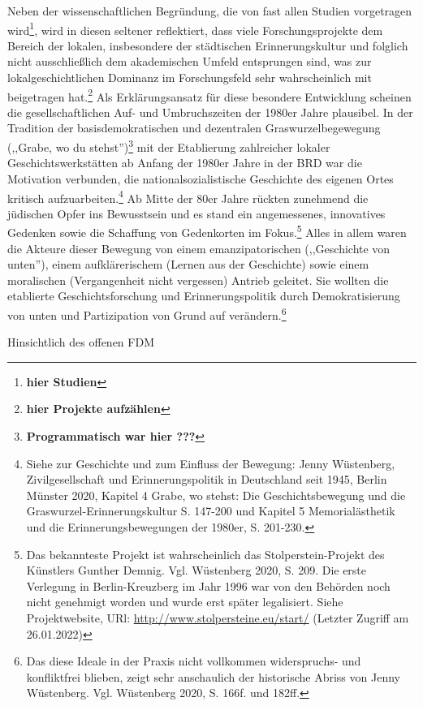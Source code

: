 Neben der wissenschaftlichen Begründung, die von fast allen Studien vorgetragen wird\footnote{\textbf{hier Studien}}, wird in diesen seltener reflektiert, dass viele Forschungsprojekte dem Bereich der lokalen, insbesondere der städtischen Erinnerungskultur und folglich nicht ausschließlich dem akademischen Umfeld entsprungen sind, was zur lokalgeschichtlichen Dominanz im Forschungsfeld sehr wahrscheinlich mit beigetragen hat.\footnote{\textbf{hier Projekte aufzählen}} Als Erklärungsansatz für diese besondere Entwicklung scheinen die gesellschaftlichen Auf- und Umbruchszeiten der 1980er Jahre plausibel. In der Tradition der basisdemokratischen und dezentralen Graswurzelbegewegung (,,Grabe, wo du stehst'')\footnote{\textbf{Programmatisch war hier ???}} mit der Etablierung zahlreicher lokaler Geschichtswerkstätten ab Anfang der 1980er Jahre in der BRD war die Motivation verbunden, die nationalsozialistische Geschichte des eigenen Ortes kritisch aufzuarbeiten.\footnote{Siehe zur Geschichte und zum Einfluss der Bewegung: Jenny Wüstenberg, Zivilgesellschaft und Erinnerungspolitik in Deutschland seit 1945, Berlin Münster 2020, Kapitel 4 Grabe, wo stehst: Die Geschichtsbewegung und die Graswurzel-Erinnerungskultur S. 147-200 und Kapitel 5 Memorialästhetik und die Erinnerungsbewegungen der 1980er, S. 201-230.} Ab Mitte der 80er Jahre rückten zunehmend die jüdischen Opfer ins Bewusstsein und es stand ein angemessenes, innovatives Gedenken sowie die Schaffung von Gedenkorten im Fokus.\footnote{Das bekannteste Projekt ist wahrscheinlich das Stolperstein-Projekt des Künstlers Gunther Demnig. Vgl. Wüstenberg 2020, S. 209. Die erste Verlegung in Berlin-Kreuzberg im Jahr 1996 war von den Behörden noch nicht genehmigt worden und wurde erst später legalisiert. Siehe Projektwebsite, URl: \url{http://www.stolpersteine.eu/start/} (Letzter Zugriff am 26.01.2022)} Alles in allem waren die Akteure dieser Bewegung von einem emanzipatorischen (,,Geschichte von unten''), einem aufklärerischem (Lernen aus der Geschichte) sowie einem moralischen (Vergangenheit nicht vergessen) Antrieb geleitet. Sie wollten die etablierte Geschichtsforschung und Erinnerungspolitik durch Demokratisierung von unten und Partizipation von Grund auf verändern.\footnote{Das diese Ideale in der Praxis nicht vollkommen widerspruchs- und konfliktfrei blieben, zeigt sehr anschaulich der historische Abriss von Jenny Wüstenberg. Vgl. Wüstenberg 2020, S. 166f. und 182ff.}

Hinsichtlich des offenen FDM


